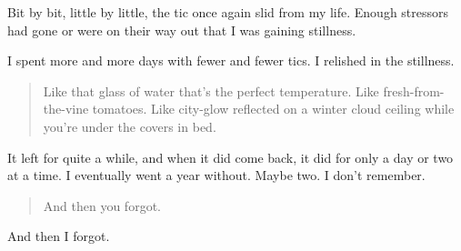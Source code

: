 Bit by bit, little by little, the tic once again slid from my life. Enough stressors had gone or were on their way out that I was gaining stillness.

I spent more and more days with fewer and fewer tics. I relished in the stillness.

\begin{quote}
Like that glass of water that's the perfect temperature. Like fresh-from-the-vine tomatoes. Like city-glow reflected on a winter cloud ceiling while you're under the covers in bed.
\end{quote}

It left for quite a while, and when it did come back, it did for only a day or two at a time. I eventually went a year without. Maybe two. I don't remember.

\begin{quote}
And then you forgot.
\end{quote}

And then I forgot.
